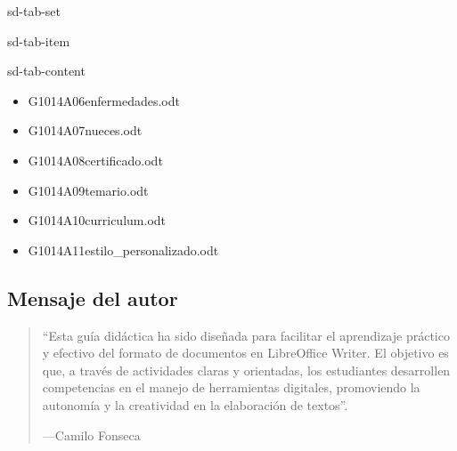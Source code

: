 \documentclass[letterpaper,10pt,spanish]{sphinxmanual}
\begin{document}
\begin{sphinxuseclass}{sd-tab-set}
\begin{sphinxuseclass}{sd-tab-item}
\begin{sphinxuseclass}{sd-tab-content}
\begin{itemize}
\item {} 
\sphinxAtStartPar
G1014A06\sphinxhyphen{}enfermedades.odt 

\item {} 
\sphinxAtStartPar
G1014A07\sphinxhyphen{}nueces.odt 

\item {} 
\sphinxAtStartPar
G1014A08\sphinxhyphen{}certificado.odt 

\item {} 
\sphinxAtStartPar
G1014A09\sphinxhyphen{}temario.odt 

\item {} 
\sphinxAtStartPar
G1014A10\sphinxhyphen{}curriculum.odt 

\item {} 
\sphinxAtStartPar
G1014A11\sphinxhyphen{}estilo\_personalizado.odt 

\end{itemize}

\end{sphinxuseclass}
\end{sphinxuseclass}
\end{sphinxuseclass}

\subsection{Mensaje del autor}
\label{\detokenize{1_guias/10ofimatica/G1014:mensaje-del-autor}}\begin{quote}

\sphinxAtStartPar
“Esta guía didáctica ha sido diseñada para facilitar el aprendizaje práctico y efectivo del formato de documentos en LibreOffice Writer. El objetivo es que, a través de actividades claras y orientadas, los estudiantes desarrollen competencias en el manejo de herramientas digitales, promoviendo la autonomía y la creatividad en la elaboración de textos”.

\begin{flushright}
---Camilo Fonseca
\end{flushright}
\end{quote}
\end{document}
